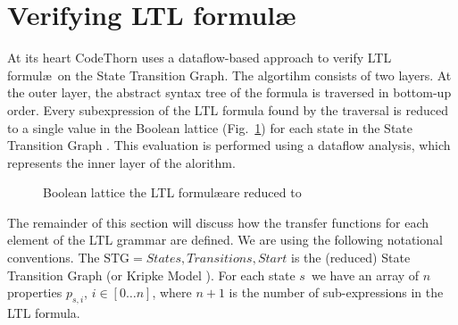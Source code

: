 \section{Verifying LTL formul\ae}

\newcommand{\ffalse}{\ensuremath{\mathit{false}}}
\newcommand{\ttrue}{\ensuremath{\mathit{true}}}

At its heart CodeThorn uses a dataflow-based approach to verify LTL
formul\ae\ on the State Transition Graph. The algortihm consists of
two layers. At the outer layer, the abstract syntax tree of the
formula is traversed in bottom-up order. Every subexpression of the
LTL formula found by the traversal is reduced to a single value in the
Boolean lattice (\cf Fig.~\ref{fig:bool_lattice}) for each state in
the State Transition Graph . This evaluation is performed using a
dataflow analysis, which represents the inner layer of the alorithm.

\begin{figure}
  \centering
  \caption{Boolean lattice the LTL formul\ae are reduced to}
  \label{fig:bool_lattice}
\end{figure}

\newcommand{\state}{\ensuremath{\mathit{s}}}
\newcommand{\STG}{\ensuremath{\mathrm{STG}}}
\newcommand{\States}{\ensuremath{\mathit{States}}}
\newcommand{\prop}[1]{\ensuremath{p_{\state,#1}}} 
\newcommand{\propp}[1]{\ensuremath{p_{\state',#1}}} 
\newcommand{\G}{\ensuremath{\mathrm{G}}}
\newcommand{\F}{\ensuremath{\mathrm{F}}}
\newcommand{\X}{\ensuremath{\mathrm{X}}}
\newcommand{\R}{\ensuremath{\mathrm{R}}}
\newcommand{\U}{\ensuremath{\mathrm{U}}}
\newcommand{\WU}{\ensuremath{\mathrm{WU}}}

The remainder of this section will discuss how the transfer functions
for each element of the LTL grammar are defined. We are using the
following notational conventions. The
$\STG={\mathit{States},\mathit{Transitions},\mathit{Start}}$ is the
(reduced) State Transition Graph (or Kripke Model
\citep[pg. 27ff]{Clarke1999}). For each state \state\ we have an array of $n$
properties \prop{i}, $i \in [0\dots n]$, where $n+1$ is the number of
sub-expressions in the LTL formula.

